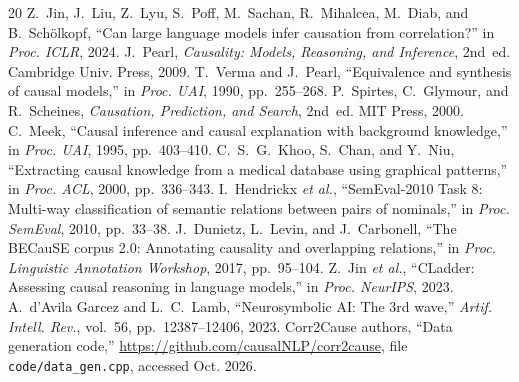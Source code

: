 \documentclass[conference]{IEEEtran}
\begin{document}
\begin{thebibliography}{20}
 Z.~Jin, J.~Liu, Z.~Lyu, S.~Poff, M.~Sachan, R.~Mihalcea, M.~Diab, and B.~Sch\"olkopf,
``Can large language models infer causation from correlation?'' in \emph{Proc. ICLR}, 2024.
 J.~Pearl, \emph{Causality: Models, Reasoning, and Inference}, 2nd~ed. Cambridge Univ.
Press, 2009.
 T.~Verma and J.~Pearl, ``Equivalence and synthesis of causal models,'' in \emph{Proc.
UAI}, 1990, pp.~255--268.
 P.~Spirtes, C.~Glymour, and R.~Scheines, \emph{Causation, Prediction, and Search},
2nd~ed. MIT Press, 2000.
 C.~Meek, ``Causal inference and causal explanation with background knowledge,'' in
\emph{Proc. UAI}, 1995, pp.~403--410.
 C.~S.~G.~Khoo, S.~Chan, and Y.~Niu, ``Extracting causal knowledge from a medical database using
graphical patterns,'' in \emph{Proc. ACL}, 2000, pp.~336--343.
 I.~Hendrickx \emph{et al.}, ``SemEval-2010 Task 8: Multi-way classification of semantic
relations between pairs of nominals,'' in \emph{Proc. SemEval}, 2010, pp.~33--38.
 J.~Dunietz, L.~Levin, and J.~Carbonell, ``The BECauSE corpus 2.0: Annotating causality and
overlapping relations,'' in \emph{Proc. Linguistic Annotation Workshop}, 2017, pp.~95--104.
 Z.~Jin \emph{et al.}, ``CLadder: Assessing causal reasoning in language models,'' in
\emph{Proc. NeurIPS}, 2023.
 A.~d'Avila Garcez and L.~C.~Lamb, ``Neurosymbolic AI: The 3rd wave,'' \emph{Artif. Intell.
Rev.}, vol.~56, pp.~12387--12406, 2023.
 Corr2Cause authors, ``Data generation code,'' \url{https://github.com/causalNLP/corr2cause},
file \texttt{code/data\_gen.cpp}, accessed Oct. 2026.
\end{thebibliography}
\end{document}
